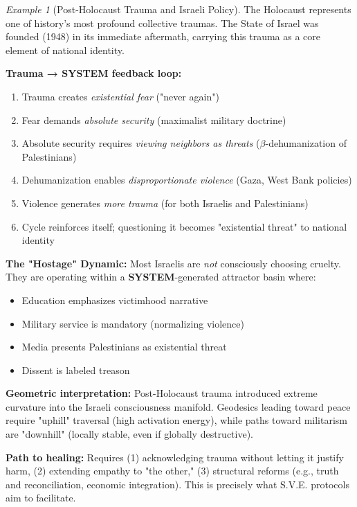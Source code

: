 \documentclass[11pt,a4paper]{article}
\newcommand{\SYSTEM}{\textbf{SYSTEM}}
\newcommand{\betaDehum}{$\beta$-dehumanization}
\theoremstyle{definition}
\theoremstyle{remark}
\newtheorem{example}{Example}[section]
\begin{document}
\begin{example}[Post-Holocaust Trauma and Israeli Policy]
The Holocaust represents one of history's most profound collective traumas. The State of Israel was founded (1948) in its immediate aftermath, carrying this trauma as a core element of national identity.

\textbf{Trauma → \SYSTEM{} feedback loop:}
\begin{enumerate}
\item Trauma creates \textit{existential fear} ("never again")
\item Fear demands \textit{absolute security} (maximalist military doctrine)
\item Absolute security requires \textit{viewing neighbors as threats} (\betaDehum{} of Palestinians)
\item Dehumanization enables \textit{disproportionate violence} (Gaza, West Bank policies)
\item Violence generates \textit{more trauma} (for both Israelis and Palestinians)
\item Cycle reinforces itself; questioning it becomes "existential threat" to national identity
\end{enumerate}

\textbf{The "Hostage" Dynamic:} Most Israelis are \textit{not} consciously choosing cruelty. They are operating within a \SYSTEM{}-generated attractor basin where:
\begin{itemize}
\item Education emphasizes victimhood narrative
\item Military service is mandatory (normalizing violence)
\item Media presents Palestinians as existential threat
\item Dissent is labeled treason
\end{itemize}

\textbf{Geometric interpretation:} Post-Holocaust trauma introduced extreme curvature into the Israeli consciousness manifold. Geodesics leading toward peace require "uphill" traversal (high activation energy), while paths toward militarism are "downhill" (locally stable, even if globally destructive).

\textbf{Path to healing:} Requires (1) acknowledging trauma without letting it justify harm, (2) extending empathy to "the other," (3) structural reforms (e.g., truth and reconciliation, economic integration). This is precisely what S.V.E. protocols aim to facilitate.
\end{example}
\end{document}
